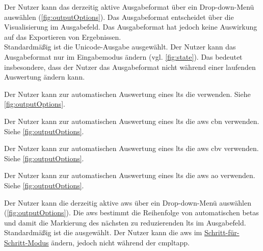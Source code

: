 \documentclass[parskip=full,11pt,twoside]{scrartcl}
\begin{document}
Der Nutzer kann das derzeitig aktive Ausgabeformat über ein Drop-down-Menü auswählen (\cref{fig:outputOptions}).
Das Ausgabeformat entscheidet über die Visualisierung im Ausgabefeld. Das Ausgabeformat hat jedoch keine Auswirkung auf das Exportieren von Ergebnissen.\\
Standardmäßig ist die Unicode-Ausgabe ausgewählt.
Der Nutzer kann das Ausgabeformat nur im Eingabemodus ändern (vgl. \cref{fig:state}).
Das bedeutet insbesondere, dass der Nutzer das Ausgabeformat nicht während einer laufenden Auswertung ändern kann.

Der Nutzer kann zur automatischen Auswertung eines \gls{lt}s die  verwenden. Siehe \cref{fig:outputOptions}.

Der Nutzer kann zur automatischen Auswertung eines \gls{lt}s die \gls{aws} \gls{cbn} verwenden. Siehe \cref{fig:outputOptions}.

Der Nutzer kann zur automatischen Auswertung eines \gls{lt}s die \gls{aws} \gls{cbv} verwenden. Siehe \cref{fig:outputOptions}.

Der Nutzer kann zur automatischen Auswertung eines \gls{lt}s die \gls{aws} \gls{ao} verwenden. Siehe \cref{fig:outputOptions}.

Der Nutzer kann die derzeitig aktive \gls{aws} über ein Drop-down-Menü auswählen (\cref{fig:outputOptions}). 
Die \gls{aws} bestimmt die Reihenfolge von automatischen \glspl{beta} und damit die Markierung des nächsten zu reduzierenden \gls{lt}s im Ausgabefeld.\\
Standardmäßig ist die  ausgewählt. 
Der Nutzer kann die \gls{aws} im \hyperref[fnc:steps]{Schritt-für-Schritt-Modus} ändern, jedoch nicht während der \gls{cmpltapp}.
\end{document}
